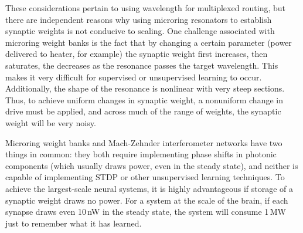 These considerations pertain to using wavelength for multiplexed routing, but there are independent reasons why using microring resonators to establish synaptic weights is not conducive to scaling. One challenge associated with microring weight banks is the fact that by changing a certain parameter (power delivered to heater, for example) the synaptic weight first increases, then saturates, the decreases as the resonance passes the target wavelength. This makes it very difficult for supervised or unsupervised learning to occur. Additionally, the shape of the resonance is nonlinear with very steep sections. Thus, to achieve uniform changes in synaptic weight, a nonuniform change in drive must be applied, and across much of the range of weights, the synaptic weight will be very noisy.

Microring weight banks and Mach-Zehnder interferometer networks have two things in common: they both require implementing phase shifts in photonic components (which usually draws power, even in the steady state), and neither is capable of implementing STDP or other unsupervised learning techniques. To achieve the largest-scale neural systems, it is highly advantageous if storage of a synaptic weight draws no power. For a system at the scale of the brain, if each synapse draws even 10\,nW in the steady state, the system will consume 1\,MW just to remember what it has learned. 

\vspace{3em}



\cite{tach2015}

